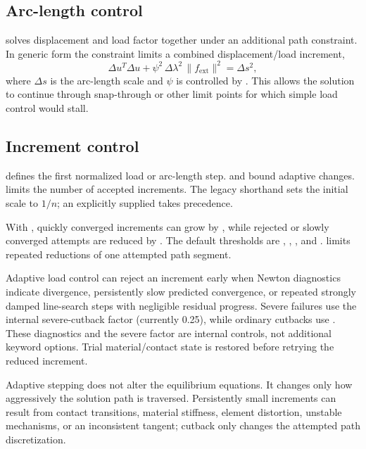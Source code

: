 \subsection*{Arc-length control}

 solves displacement and load factor together under an additional path constraint. In generic form the constraint limits a combined displacement/load increment,
\[
\Delta u^T\Delta u
+\psi^2\,\Delta\lambda^2\,\|f_\mathrm{ext}\|^2
=\Delta s^2,
\]
where \(\Delta s\) is the arc-length scale and \(\psi\) is controlled by . This allows the solution to continue through snap-through or other limit points for which simple load control would stall.

\subsection*{Increment control}

 defines the first normalized load or arc-length step.  and  bound adaptive changes.  limits the number of accepted increments. The legacy  shorthand sets the initial scale to \(1/n\); an explicitly supplied  takes precedence.

With , quickly converged increments can grow by , while rejected or slowly converged attempts are reduced by . The default thresholds are , , , and .  limits repeated reductions of one attempted path segment.

Adaptive load control can reject an increment early when Newton diagnostics indicate divergence, persistently slow predicted convergence, or repeated strongly damped line-search steps with negligible residual progress. Severe failures use the internal severe-cutback factor (currently 0.25), while ordinary cutbacks use . These diagnostics and the severe factor are internal controls, not additional  keyword options. Trial material/contact state is restored before retrying the reduced increment.

Adaptive stepping does not alter the equilibrium equations. It changes only how aggressively the solution path is traversed. Persistently small increments can result from contact transitions, material stiffness, element distortion, unstable mechanisms, or an inconsistent tangent; cutback only changes the attempted path discretization.

